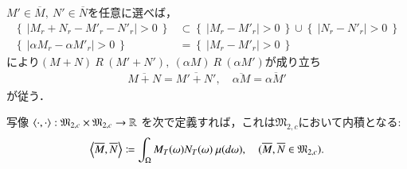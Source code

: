 	\begin{prf}
		$M' \in \overline{M},\ N' \in \overline{N}$を任意に選べば，
		\begin{align}
			\left\{\ \left|M_r + N_r - M'_r - N'_r \right| > 0\ \right\} &\subset \left\{\ \left|M_r - M'_r \right| > 0\ \right\} \cup \left\{\ \left|N_r - N'_r \right| > 0\ \right\} \\
			\left\{\ \left|\alpha M_r - \alpha M'_r \right| > 0\ \right\} &= \left\{\ \left|M_r - M'_r \right| > 0\ \right\}
		\end{align}
		により$(M+N)\ R\ (M'+N'),\ (\alpha M)\ R\ (\alpha M')$が成り立ち
		\begin{align}
			\overline{M+N} = \overline{M'+N'}, \quad \overline{\alpha M} = \overline{\alpha M'}
		\end{align}
		が従う．
		\QED
	\end{prf}
	
	\begin{itembox}[l]{}
		\begin{lem}
			写像\footnotemark
			$\inprod<\cdot,\cdot>:\mathfrak{M}_{2,c} \times \mathfrak{M}_{2,c} \rightarrow \R$
			を次で定義すれば，これは$\mathfrak{M}_{2,c}$において内積となる:
			\begin{align}
				\inprod<\overline{M},\overline{N}> \coloneqq \int_{\Omega} M_T(\omega)N_T(\omega)\ \mu(d\omega), \quad (\overline{M},\overline{N} \in \mathfrak{M}_{2,c}).
				\label{eq:M_2c_inner_product}
			\end{align}
			\label{lem:M_2c_hilbert_inner_product}
		\end{lem}
	\end{itembox}
			
			
